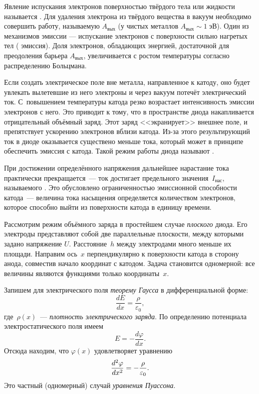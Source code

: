 Явление испускания электронов поверхностью твёрдого тела или жидкости называется
. Для удаления электрона из твёрдого вещества в
вакуум необходимо совершить работу, называемую  $A_{вых}$
(у чистых металлов $A_{вых}\sim 1\;эВ$).
Один из механизмов эмиссии --- испускание электронов с поверхности сильно
нагретых тел ( эмиссия). 
Доля электронов, обладающих энергией, достаточной для преодоления барьера
$A_{вых}$, увеличивается с ростом температуры согласно 
распределению Больцмана.


Если создать электрическое поле вне металла, направленное к катоду, 
оно будет увлекать вылетевшие из него электроны 
и через вакуум потечёт электрический ток.
С~повышением температуры катода резко возрастает интенсивность эмиссии электронов с него. 
Это приводит к тому, что в пространстве
диода
накапливается отрицательный
объёмный заряд. Этот заряд <<экранирует>> внешнее поле, и препятствует ускорению электронов
вблизи катода. Из-за этого результирующий ток в диоде оказывается существено меньше тока, 
который может в принципе обеспечить эмиссия с катода. 
Такой режим работы диода называют .

При достижении определённого напряжения дальнейшее нарастание тока практически
прекращается~--- ток достигает предельного значения~$I_{нас}$, называемого
. Это обусловлено ограниченностью эмиссионной способности
катода~--- величина тока насыщения определяется количеством электронов,
которое способно выйти из поверхности катода в единицу времени.


Рассмотрим режим объёмного заряда в простейшем случае \emph{плоского}
диода. Его электроды представляют собой две параллельные плоскости,
между которыми задано напряжение $U$. Расстояние~$h$ между электродами много
меньше их площади. Направим ось~$x$ перпендикулярно к поверхности катода
в сторону анода, совместив начало координат с катодом. Задача
становится одномерной: все величины являются функциями только координаты~$x$.

Запишем для электрического поля \emph{теорему Гаусса} в дифференциальной
форме:
\[
\frac{dE}{dx} = \frac{\rho}{\varepsilon_0},
\]
где~$\rho(x)$~--- \emph{плотность электрического заряда}. По определению
потенциала электростатического поля имеем
\[
E = -\frac{d\varphi}{dx}.
\]
Отсюда находим, что $\varphi(x)$ удовлетворяет уравнению
\begin{equation}
    \eqmark{3.14}
    \frac{d^2\varphi}{dx^2}=-\frac{\rho}{\varepsilon_0}.
\end{equation}
Это частный (одномерный) случай \emph{уравнения Пуассона}.

